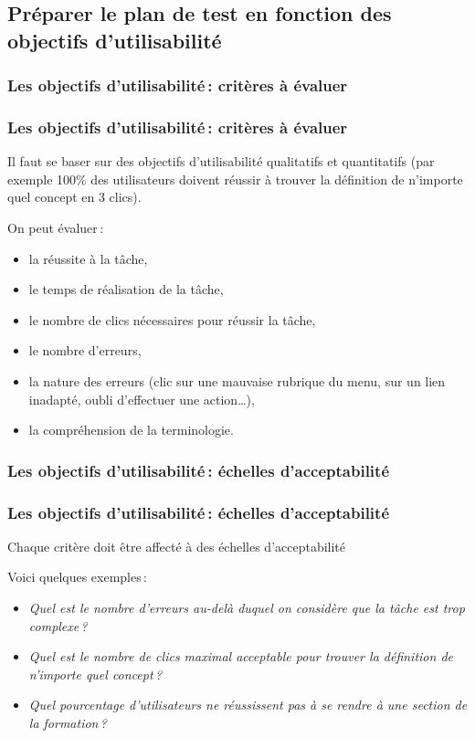	\subsection{Préparer le plan de test en fonction des objectifs d'utilisabilité} 
	\subsubsection{Les objectifs d'utilisabilité\,: critères à évaluer} 

		\begin{frame}[allowframebreaks]
			\frametitle{Les objectifs d'utilisabilité\,: critères à évaluer \citep{ergolab2014a}}
			Il faut se baser sur des objectifs d'utilisabilité qualitatifs et quantitatifs (par exemple 100\% des utilisateurs doivent réussir à trouver la définition de n'importe quel concept en 3 clics). 
			\par
			\framebreak
			On peut évaluer\,: 
			\begin {itemize}
				      \item la réussite à la tâche,
				      \item le temps de réalisation de la tâche,
				      \item le nombre de clics nécessaires pour réussir la tâche,
				      \item le nombre d'erreurs,
				      \item la nature des erreurs (clic sur une mauvaise rubrique du menu, sur un lien inadapté, oubli d'effectuer une action…),
				      \item la compréhension de la terminologie.
			\end{itemize}
		\end{frame}      
		
		  \subsubsection{Les objectifs d'utilisabilité\,: échelles d'acceptabilité} 

		\begin{frame}[allowframebreaks]
			\frametitle{Les objectifs d'utilisabilité\,: échelles d'acceptabilité \citep{ergolab2014a}}
			Chaque critère doit être affecté à des échelles d'acceptabilité
			\par
			Voici quelques exemples\,: 
			\begin {itemize}
				      \item \textit{Quel est le nombre d'erreurs au-delà duquel on considère que la tâche est trop complexe\,?}
				      \item \textit{Quel est le nombre de clics maximal acceptable pour trouver la définition de n'importe quel concept\,?}
					\item \textit{Quel pourcentage d'utilisateurs ne réussissent pas à se rendre à une section de la formation\,? }
			\end{itemize}
		\end{frame} 
